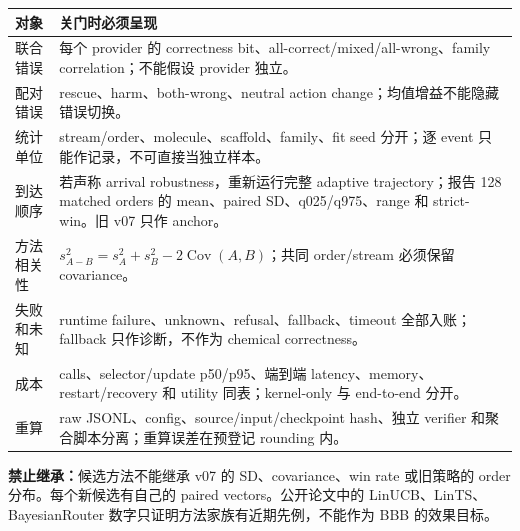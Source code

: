 \documentclass[10pt,letterpaper]{article}
\newcommand{\sect}[1]{\vspace{4pt}{\large\bfseries\color{GuideBlue}#1}\par\vspace{2pt}}
\newenvironment{clean}{\begin{center}\fontsize{8.55}{10.05}\selectfont\setlength{\tabcolsep}{3.7pt}\renewcommand{\arraystretch}{1.04}}{\end{center}}
\begin{document}
\newpage
\sect{8. 结果分布和误差合同}
\begin{clean}
\begin{tabular}{@{}p{.20\linewidth}p{.66\linewidth}@{}}
\toprule
对象 & 关门时必须呈现\\
\midrule
联合错误 & 每个 provider 的 correctness bit、all-correct/mixed/all-wrong、family correlation；不能假设 provider 独立。\\
配对错误 & rescue、harm、both-wrong、neutral action change；均值增益不能隐藏错误切换。\\
统计单位 & stream/order、molecule、scaffold、family、fit seed 分开；逐 event 只能作记录，不可直接当独立样本。\\
到达顺序 & 若声称 arrival robustness，重新运行完整 adaptive trajectory；报告 128 matched orders 的 mean、paired SD、q025/q975、range 和 strict-win。旧 v07 只作 anchor。\\
方法相关性 & $s^2_{A-B}=s_A^2+s_B^2-2\operatorname{Cov}(A,B)$；共同 order/stream 必须保留 covariance。\\
失败和未知 & runtime failure、unknown、refusal、fallback、timeout 全部入账；fallback 只作诊断，不作为 chemical correctness。\\
成本 & calls、selector/update p50/p95、端到端 latency、memory、restart/recovery 和 utility 同表；kernel-only 与 end-to-end 分开。\\
重算 & raw JSONL、config、source/input/checkpoint hash、独立 verifier 和聚合脚本分离；重算误差在预登记 rounding 内。\\
\bottomrule
\end{tabular}
\end{clean}
\textbf{禁止继承：}候选方法不能继承 v07 的 SD、covariance、win rate 或旧策略的 order 分布。每个新候选有自己的 paired vectors。公开论文中的 LinUCB、LinTS、BayesianRouter 数字只证明方法家族有近期先例，不能作为 BBB 的效果目标。
\end{document}

